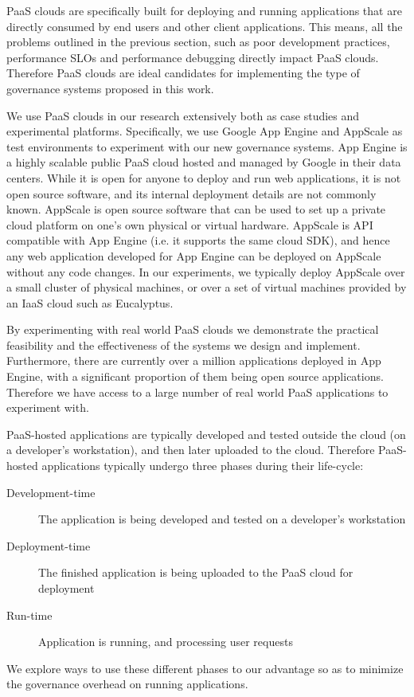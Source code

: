 PaaS clouds are specifically built for deploying and running applications
that are directly consumed by end users and other client applications. This means, all the problems 
outlined in the previous section, such as poor development practices, performance SLOs and performance 
debugging directly impact PaaS clouds. Therefore PaaS clouds are ideal candidates for implementing the type
of governance systems proposed in this work. 

We use PaaS clouds in our research extensively both as case studies
and experimental platforms. Specifically, we use Google App Engine and AppScale as test environments
to experiment with our new governance systems. App Engine is a highly scalable public PaaS cloud hosted and
managed by Google in their data centers. While it is open for anyone to deploy and run web applications, it is not
open source software, and its internal deployment details are not commonly known. AppScale is open source
software that can be used to set up a private cloud platform on one's own physical or virtual hardware. AppScale
is API compatible with App Engine (i.e. it supports the same cloud SDK), and hence any web application developed
for App Engine can be deployed on AppScale without any code changes. In our experiments, we typically deploy
AppScale over a small cluster of physical machines, or over a set of virtual machines provided by an IaaS cloud
such as Eucalyptus.

By experimenting with real world PaaS clouds we demonstrate the practical feasibility and the effectiveness of 
the systems we design and implement. Furthermore, there are currently over a million applications deployed
in App Engine, with a significant proportion of them being open source applications. Therefore we have access
to a large number of real world PaaS applications to experiment with.

PaaS-hosted applications are typically developed and tested outside the cloud (on a developer's workstation), 
and then later uploaded to the cloud. Therefore PaaS-hosted applications typically undergo three phases 
during their life-cycle:
\begin{description}
\item[Development-time] The application is being developed and tested on a developer's workstation
\item[Deployment-time] The finished application is being uploaded to the PaaS cloud for deployment
\item[Run-time] Application is running, and processing user requests
\end{description}
We explore ways to use these different phases to our advantage so as to minimize the governance
overhead on running applications. 

